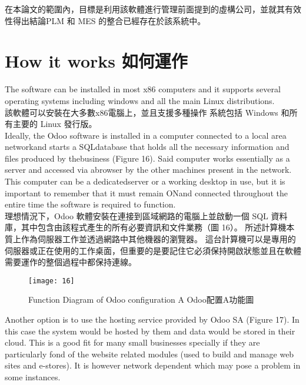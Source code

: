 \fontsize{12}{2.5pt}\sectionef 
{在本論文的範圍內，目標是利用該軟體進行管理前面提到的虛構公司，並就其有效性得出結論PLM 和 MES 的整合已經存在於該系統中。}\\[15pt]

\section{How it works 如何運作 }
\fontsize{12}{2.5pt}\sectionef 
 {The software can be installed in most x86 computers and it supports several operating
systems including windows and all the main Linux distributions.}\\[1pt]

\fontsize{12}{2.5pt}\sectionef  
{該軟體可以安裝在大多數x86電腦上，並且支援多種操作
系統包括 Windows 和所有主要的 Linux 發行版。}\\[15pt]

\fontsize{12}{2.5pt}\sectionef 
 {Ideally, the Odoo software is installed in a computer connected to a local area networkand starts a SQLdatabase that holds all the necessary information and files produced by thebusiness (Figure 16). Said computer works essentially as a server and accessed via abrowser by the other machines present in the network. This computer can be a dedicatedserver or a working desktop in use, but it is important to remember that it must remain ONand connected throughout the entire time the software is required to function.}\\[1pt]

\fontsize{12}{2.5pt}\sectionef  
{理想情況下，Odoo 軟體安裝在連接到區域網路的電腦上並啟動一個 SQL 資料庫，其中包含由該程式產生的所有必要資訊和文件業務（圖 16）。 所述計算機本質上作為伺服器工作並透過網路中其他機器的瀏覽器。 這台計算機可以是專用的伺服器或正在使用的工作桌面，但重要的是要記住它必須保持開啟狀態並且在軟體需要運作的整個過程中都保持連線。}
\\[15pt]


\begin{figure}[hbt!]
\begin{center}
\texttt{[image: 16]}
\caption{\Large  Function Diagram of Odoo configuration A Odoo配置A功能圖}\label{fig.16}
\end{center}
\end{figure}


\fontsize{12}{2.5pt}\sectionef 
 {Another option is to use the hosting service provided by Odoo SA (Figure 17). In this case
the system would be hosted by them and data would be stored in their cloud. This is a good
fit for many small businesses specially if they are particularly fond of the website related
modules (used to build and manage web sites and e-stores). It is however network dependent
which may pose a problem in some instances.}\\[1pt]

